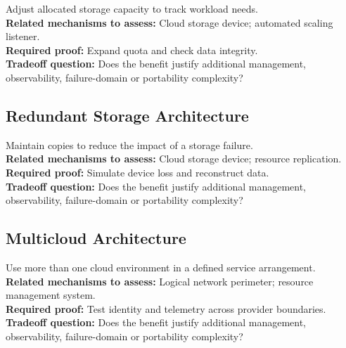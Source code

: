 \documentclass[10pt,letterpaper]{article}
\begin{document}
Adjust allocated storage capacity to track workload needs.\\[3pt]
\textbf{Related mechanisms to assess:} Cloud storage device; automated scaling listener.\\[3pt]
\textbf{Required proof:} Expand quota and check data integrity.\\[3pt]
\textbf{Tradeoff question:} Does the benefit justify additional management, observability, failure-domain or portability complexity?\\[3pt]
\subsection{Redundant Storage Architecture}
Maintain copies to reduce the impact of a storage failure.\\[3pt]
\textbf{Related mechanisms to assess:} Cloud storage device; resource replication.\\[3pt]
\textbf{Required proof:} Simulate device loss and reconstruct data.\\[3pt]
\textbf{Tradeoff question:} Does the benefit justify additional management, observability, failure-domain or portability complexity?\\[3pt]
\subsection{Multicloud Architecture}
Use more than one cloud environment in a defined service arrangement.\\[3pt]
\textbf{Related mechanisms to assess:} Logical network perimeter; resource management system.\\[3pt]
\textbf{Required proof:} Test identity and telemetry across provider boundaries.\\[3pt]
\textbf{Tradeoff question:} Does the benefit justify additional management, observability, failure-domain or portability complexity?\\[3pt]
\end{document}
